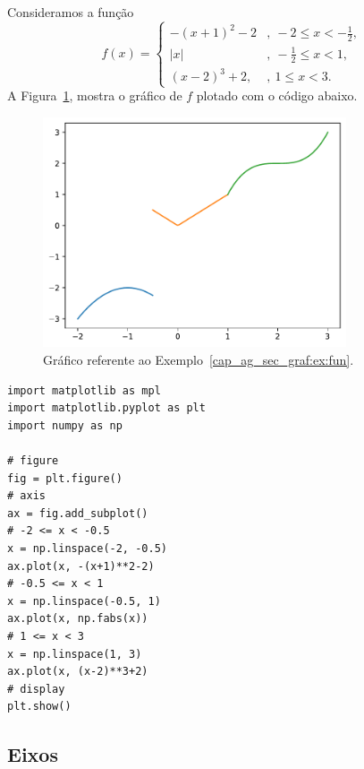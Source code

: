 \begin{ex}\label{cap_ag_sec_graf:ex:fun}
  Consideramos a função
  \begin{equation}
    f(x) = \left\{
      \begin{array}{ll}
        -(x+1)^2-2 &, ~-2\leq x < -\frac{1}{2},\\
        |x| &, ~-\frac{1}{2}\leq x < 1,\\
        (x-2)^3 + 2, &, ~1\leq x < 3.
      \end{array}
    \right.
  \end{equation}
  A Figura~\ref{cap_ag_sec_graf:fig:fun}, mostra o gráfico de $f$ plotado com o código abaixo.

  \begin{figure}[H]
    \centering
    \includegraphics[width=0.8\textwidth]{./cap_ag/dados/fig_fun/fig}
    \caption{Gráfico referente ao Exemplo~\ref{cap_ag_sec_graf:ex:fun}.}
    \label{cap_ag_sec_graf:fig:fun}
  \end{figure}  

\begin{lstlisting}
import matplotlib as mpl
import matplotlib.pyplot as plt
import numpy as np

# figure
fig = plt.figure()
# axis
ax = fig.add_subplot()
# -2 <= x < -0.5
x = np.linspace(-2, -0.5)
ax.plot(x, -(x+1)**2-2)
# -0.5 <= x < 1
x = np.linspace(-0.5, 1)
ax.plot(x, np.fabs(x))
# 1 <= x < 3
x = np.linspace(1, 3)
ax.plot(x, (x-2)**3+2)
# display
plt.show()
\end{lstlisting}
\end{ex}

\subsection{Eixos}

